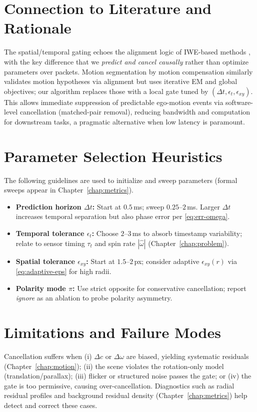 \section{Connection to Literature and Rationale}
The spatial/temporal gating echoes the alignment logic of IWE-based methods \cite{Gallego2018CMax}, with the key difference that we \emph{predict and cancel causally} rather than optimize parameters over packets. Motion segmentation by motion compensation \cite{Stoffregen2019Segmentation} similarly validates motion hypotheses via alignment but uses iterative EM and global objectives; our algorithm replaces those with a local gate tuned by $(\Delta t,\epsilon_t,\epsilon_{xy})$. This allows immediate suppression of predictable ego-motion events via software-level cancellation (matched-pair removal), reducing bandwidth and computation for downstream tasks, a pragmatic alternative when low latency is paramount.

\section{Parameter Selection Heuristics}
The following guidelines are used to initialize and sweep parameters (formal sweeps appear in Chapter~\ref{chap:metrics}).
\begin{itemize}
    \item \textbf{Prediction horizon $\Delta t$:} Start at $0.5$\,ms; sweep $0.25$–$2$\,ms. Larger $\Delta t$ increases temporal separation but also phase error per \eqref{eq:err-omega}.
    \item \textbf{Temporal tolerance $\epsilon_t$:} Choose $2$–$3$\,ms to absorb timestamp variability; relate to sensor timing $\tau_t$ and spin rate $|\hat\omega|$ (Chapter~\ref{chap:problem}).
    \item \textbf{Spatial tolerance $\epsilon_{xy}$:} Start at $1.5$–$2$\,px; consider adaptive $\epsilon_{xy}(r)$ via \eqref{eq:adaptive-eps} for high radii.
    \item \textbf{Polarity mode $\pi$:} Use strict opposite for conservative cancellation; report \emph{ignore} as an ablation to probe polarity asymmetry.
\end{itemize}

\section{Limitations and Failure Modes}
Cancellation suffers when (i) $\Delta c$ or $\Delta\omega$ are biased, yielding systematic residuals (Chapter~\ref{chap:motion}); (ii) the scene violates the rotation-only model (translation/parallax); (iii) flicker or structured noise passes the gate; or (iv) the gate is too permissive, causing over-cancellation. Diagnostics such as radial residual profiles and background residual density (Chapter~\ref{chap:metrics}) help detect and correct these cases.

